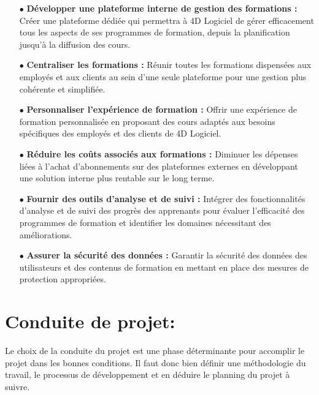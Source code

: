 \begin{itemize}
    \item[$\bullet$] \textbf{Développer une plateforme interne de gestion des formations :} Créer une plateforme dédiée qui permettra à 4D Logiciel de gérer efficacement tous les aspects de ses programmes de formation, depuis la planification jusqu'à la diffusion des cours.

    \item[$\bullet$] \textbf{Centraliser les formations :} Réunir toutes les formations dispensées aux employés et aux clients au sein d'une seule plateforme pour une gestion plus cohérente et simplifiée.

    \item[$\bullet$] \textbf{Personnaliser l'expérience de formation :} Offrir une expérience de formation personnalisée en proposant des cours adaptés aux besoins spécifiques des employés et des clients de 4D Logiciel.

    \item[$\bullet$] \textbf{Réduire les coûts associés aux formations :} Diminuer les dépenses liées à l'achat d'abonnements sur des plateformes externes en développant une solution interne plus rentable sur le long terme.

    \item[$\bullet$] \textbf{Fournir des outils d'analyse et de suivi :} Intégrer des fonctionnalités d'analyse et de suivi des progrès des apprenants pour évaluer l'efficacité des programmes de formation et identifier les domaines nécessitant des améliorations.
   
    \item[$\bullet$] \textbf{Assurer la sécurité des données :} Garantir la sécurité des données des utilisateurs et des contenus de formation en mettant en place des mesures de protection appropriées.

\end{itemize}

\section{Conduite de projet:}

Le choix de la conduite du projet est une phase déterminante pour accomplir le projet dans les bonnes conditions. Il faut donc bien définir une méthodologie du travail, le
processus de développement et en déduire le planning du projet à suivre.

